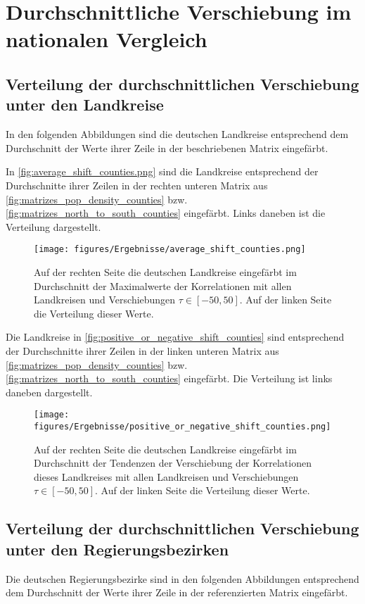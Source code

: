 \section{Durchschnittliche Verschiebung im nationalen Vergleich}
\subsection{Verteilung der durchschnittlichen Verschiebung unter den Landkreise}
In den folgenden Abbildungen sind die deutschen Landkreise entsprechend dem Durchschnitt der Werte ihrer Zeile in der beschriebenen Matrix eingefärbt.


In \autoref{fig:average_shift_counties.png} sind die Landkreise entsprechend der Durchschnitte ihrer Zeilen in der rechten unteren Matrix aus \autoref{fig:matrizes_pop_density_counties} bzw. \autoref{fig:matrizes_north_to_south_counties} eingefärbt. Links daneben ist die Verteilung dargestellt.

\begin{figure}[H]
    \centering
    \texttt{[image: figures/Ergebnisse/average\_shift\_counties.png]}
    \caption{Auf der rechten Seite die deutschen Landkreise eingefärbt im Durchschnitt der Maximalwerte der Korrelationen mit allen Landkreisen und Verschiebungen $\tau\in[-50,50]$. Auf der linken Seite die Verteilung dieser Werte.}
    \label{fig:average_shift_counties.png}
\end{figure}

Die Landkreise in \autoref{fig:positive_or_negative_shift_counties} sind  entsprechend der Durchschnitte ihrer Zeilen in der linken unteren Matrix aus \autoref{fig:matrizes_pop_density_counties} bzw. \autoref{fig:matrizes_north_to_south_counties} eingefärbt. Die Verteilung ist links daneben dargestellt.

\begin{figure}[H]
    \centering
    \texttt{[image: figures/Ergebnisse/positive\_or\_negative\_shift\_counties.png]}
    \caption{Auf der rechten Seite die deutschen Landkreise eingefärbt im Durchschnitt der Tendenzen der Verschiebung der Korrelationen dieses Landkreises mit allen Landkreisen und Verschiebungen $\tau\in[-50,50]$. Auf der linken Seite die Verteilung dieser Werte.}
    \label{fig:positive_or_negative_shift_counties}
\end{figure}



\subsection{Verteilung der durchschnittlichen Verschiebung unter den Regierungsbezirken}
Die deutschen Regierungsbezirke sind in den folgenden Abbildungen entsprechend dem Durchschnitt der Werte ihrer Zeile in der referenzierten Matrix eingefärbt.


